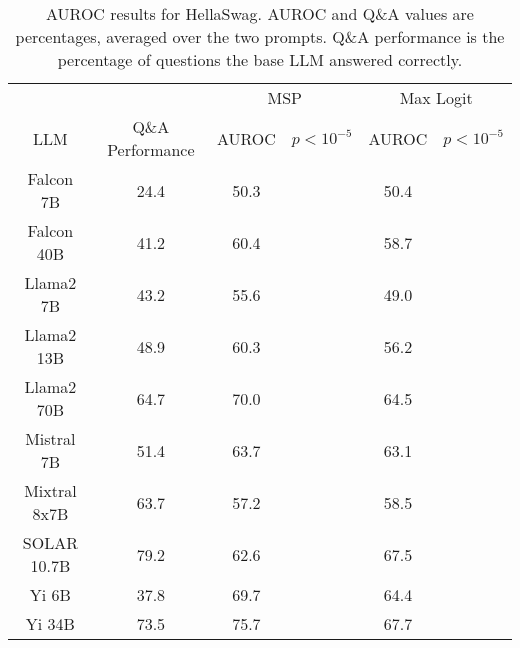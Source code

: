 \begin{table*}
\centering
\begin{tabular}{c|c|c|c|c|c}
& & \multicolumn{2}{c|}{MSP} & \multicolumn{2}{c}{Max Logit} \\ 
LLM & Q\&A Performance & AUROC & $p < 10^{-5}$ & AUROC & $p < 10^{-5}$\\ \hline
Falcon 7B & 24.4 & 50.3 &  & 50.4 & \\
Falcon 40B & 41.2 & 60.4 &  & 58.7 & \\
Llama2 7B & 43.2 & 55.6 &  & 49.0 & \\
Llama2 13B & 48.9 & 60.3 &  & 56.2 & \\
Llama2 70B & 64.7 & 70.0 &  & 64.5 & \\
Mistral 7B & 51.4 & 63.7 &  & 63.1 & \\
Mixtral 8x7B & 63.7 & 57.2 &  & 58.5 & \\
SOLAR 10.7B & 79.2 & 62.6 &  & 67.5 & \\
Yi 6B & 37.8 & 69.7 &  & 64.4 & \\
Yi 34B & 73.5 & 75.7 &  & 67.7 & \\
\hline
\end{tabular}
\caption{AUROC results for HellaSwag. AUROC and Q\&A values are percentages, averaged over the two prompts. Q\&A performance is the percentage of questions the base LLM answered correctly.}
\label{tab:hellaswag_auroc}
\end{table*}

